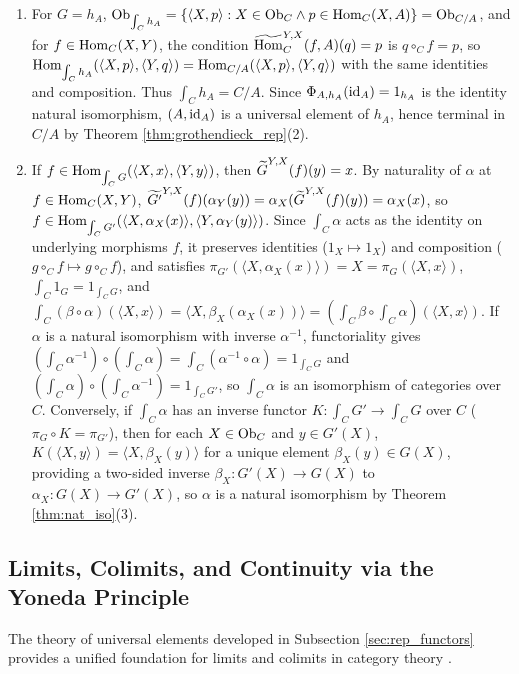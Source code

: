 \documentclass[10pt,a4paper]{article}
\begin{document}
\begin{enumerate}
\item For $G = h_A$, ${\textrm{Ob}}_{\int_C h_A} = \{\langle X, p \rangle : X \in {\textrm{Ob}}_C \land p \in {\textrm{Hom}}_C(X, A)\} = {\textrm{Ob}}_{C/A}$, and for $f \in {\textrm{Hom}}_C(X, Y)$, the condition ${\widetilde{{\textrm{Hom}}}\textrm{}}_C^{Y,X}(f, A)(q) = p$ is $q \circ_C f = p$, so ${\textrm{Hom}}_{\int_C h_A}(\langle X,p \rangle, \langle Y,q \rangle) = {\textrm{Hom}}_{C/A}(\langle X,p \rangle, \langle Y,q \rangle)$ with the same identities and composition. Thus $\int_C h_A = C / A$. Since $\Phi_{A,h_A}({\textrm{id}}_A) = 1_{h_A}$ is the identity natural isomorphism, $(A, {\textrm{id}}_A)$ is a universal element of $h_A$, hence terminal in $C / A$ by Theorem \ref{thm:grothendieck_rep}(2).
\item If $f \in {\textrm{Hom}}_{\int_C G}(\langle X, x \rangle, \langle Y, y \rangle)$, then ${\widetilde{G}\textrm{}}^{Y,X}(f)(y) = x$. By naturality of $\alpha$ at $f \in {\textrm{Hom}}_C(X, Y)$, $\widetilde{G'}^{Y,X}(f)(\alpha_Y(y)) = \alpha_X({\widetilde{G}\textrm{}}^{Y,X}(f)(y)) = \alpha_X(x)$, so $f \in {\textrm{Hom}}_{\int_C G'}(\langle X, \alpha_X(x) \rangle, \langle Y, \alpha_Y(y) \rangle)$. Since $\int_C \alpha$ acts as the identity on underlying morphisms $f$, it preserves identities ($1_X \mapsto 1_X$) and composition ($g \circ_C f \mapsto g \circ_C f$), and satisfies $\pi_{G'}(\langle X, \alpha_X(x) \rangle) = X = \pi_G(\langle X, x \rangle)$, $\int_C 1_G = 1_{\int_C G}$, and $\int_C(\beta \circ \alpha)(\langle X, x \rangle) = \langle X, \beta_X(\alpha_X(x)) \rangle = (\int_C \beta \circ \int_C \alpha)(\langle X, x \rangle)$.
If $\alpha$ is a natural isomorphism with inverse $\alpha^{-1}$, functoriality gives $(\int_C \alpha^{-1}) \circ (\int_C \alpha) = \int_C(\alpha^{-1} \circ \alpha) = 1_{\int_C G}$ and $(\int_C \alpha) \circ (\int_C \alpha^{-1}) = 1_{\int_C G'}$, so $\int_C \alpha$ is an isomorphism of categories over $C$. Conversely, if $\int_C \alpha$ has an inverse functor $K : \int_C G' \to \int_C G$ over $C$ ($\pi_G \circ K = \pi_{G'}$), then for each $X \in {\textrm{Ob}}_C$ and $y \in G'(X)$, $K(\langle X, y \rangle) = \langle X, \beta_X(y) \rangle$ for a unique element $\beta_X(y) \in G(X)$, providing a two-sided inverse $\beta_X : G'(X) \to G(X)$ to $\alpha_X : G(X) \to G'(X)$, so $\alpha$ is a natural isomorphism by Theorem \ref{thm:nat_iso}(3).
\end{enumerate}
\myqed

\subsection{Limits, Colimits, and Continuity via the Yoneda Principle}\label{sec:limits_colimits}
The theory of universal elements developed in Subsection \ref{sec:rep_functors} provides a unified foundation for limits and colimits in category theory \cite{MacLane1998,Riehl2016,Borceux1994}.
\end{document}

